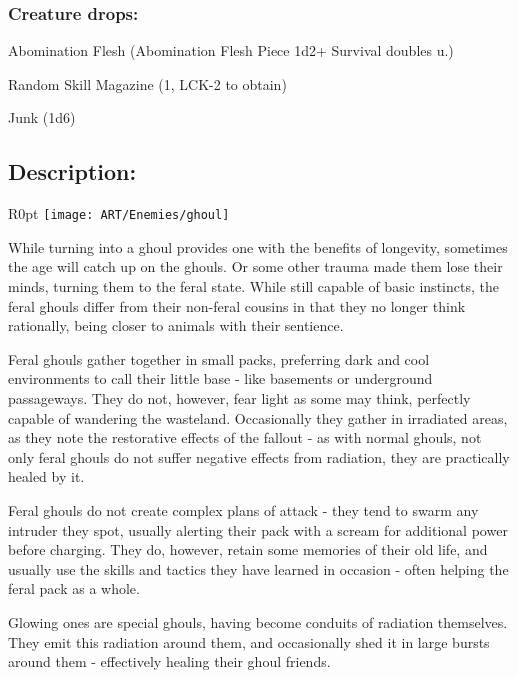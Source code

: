 \documentclass[11pt,a4paper,twocolumn]{book}
\begin{document}
\subsubsection*{Creature drops:}
\begin{compactitem}
	\item Abomination Flesh (Abomination Flesh Piece 1d2+ Survival doubles u.)
	\item Random Skill Magazine (1, LCK-2 to obtain)
	\item Junk (1d6)
\end{compactitem}
	
	\subsection*{Description:}
	
	\begin{wrapfigure}{R}{0pt}
		\texttt{[image: ART/Enemies/ghoul]}
	\end{wrapfigure}
	
	While turning into a ghoul provides one with the benefits of longevity, sometimes the age will catch up on the ghouls. Or some other trauma made them lose their minds, turning them to the feral state. While still capable of basic instincts, the feral ghouls differ from their non-feral cousins in that they no longer think rationally, being closer to animals with their sentience.
	
	Feral ghouls gather together in small packs, preferring dark and cool environments to call their little base - like basements or underground passageways. They do not, however, fear light as some may think, perfectly capable of wandering the wasteland. Occasionally they gather in  irradiated areas, as they note the restorative effects of the fallout - as with normal ghouls, not only feral ghouls do not suffer negative effects from radiation, they are practically healed by it. 
	
	\bigskip
	Feral ghouls do not create complex plans of attack - they tend to swarm any intruder they spot, usually alerting their pack with a scream for additional power before charging. They do, however, retain some memories of their old life, and usually use the skills and tactics they have learned in occasion - often helping the feral pack as a whole.
	
	Glowing ones are special ghouls, having become conduits of radiation themselves. They emit this radiation around them, and occasionally shed it in large bursts around them - effectively healing their ghoul friends.
	
\end{document}
